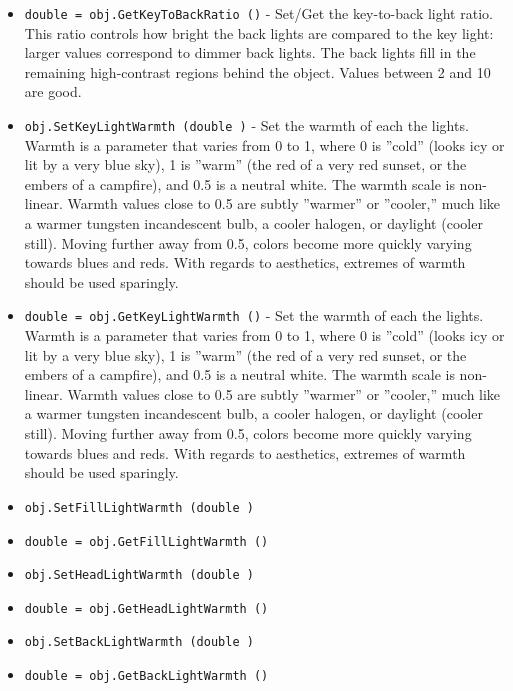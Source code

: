\begin{itemize}
\item  \verb|double = obj.GetKeyToBackRatio ()| -  Set/Get the key-to-back light ratio.  This ratio controls
 how bright the back lights are compared to the key light: larger
 values correspond to dimmer back lights.  The back lights fill
 in the remaining high-contrast regions behind the object.
 Values between 2 and 10 are good.

\item  \verb|obj.SetKeyLightWarmth (double )| -  Set the warmth of each the lights.  Warmth is a parameter that
 varies from 0 to 1, where 0 is ''cold'' (looks icy or lit by a very
 blue sky), 1 is ''warm'' (the red of a very red sunset, or the
 embers of a campfire), and 0.5 is a neutral white.  The warmth
 scale is non-linear. Warmth values close to 0.5 are subtly
 ''warmer'' or ''cooler,'' much like a warmer tungsten incandescent
 bulb, a cooler halogen, or daylight (cooler still).  Moving
 further away from 0.5, colors become more quickly varying towards
 blues and reds.  With regards to aesthetics, extremes of warmth
 should be used sparingly.

\item  \verb|double = obj.GetKeyLightWarmth ()| -  Set the warmth of each the lights.  Warmth is a parameter that
 varies from 0 to 1, where 0 is ''cold'' (looks icy or lit by a very
 blue sky), 1 is ''warm'' (the red of a very red sunset, or the
 embers of a campfire), and 0.5 is a neutral white.  The warmth
 scale is non-linear. Warmth values close to 0.5 are subtly
 ''warmer'' or ''cooler,'' much like a warmer tungsten incandescent
 bulb, a cooler halogen, or daylight (cooler still).  Moving
 further away from 0.5, colors become more quickly varying towards
 blues and reds.  With regards to aesthetics, extremes of warmth
 should be used sparingly.

\item  \verb|obj.SetFillLightWarmth (double )|

\item  \verb|double = obj.GetFillLightWarmth ()|

\item  \verb|obj.SetHeadLightWarmth (double )|

\item  \verb|double = obj.GetHeadLightWarmth ()|

\item  \verb|obj.SetBackLightWarmth (double )|

\item  \verb|double = obj.GetBackLightWarmth ()|


\end{itemize}
